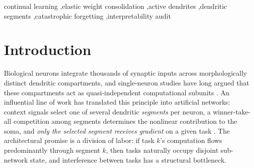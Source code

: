 \documentclass[review,12pt,number]{elsarticle}
\begin{document}
\begin{frontmatter}
\begin{abstract}
constant bias on the own-segment dendritic input raises the learning term
in every cell of a $\{$dataset$\}\times\{$depth$\}\times\{$granularity$\}$
grid ($\Delta\ell>0$ in $22/22$ dose cells, significant in $20/22$ at
$n{=}10$ paired), with final accuracy improving in step ($19/22$
simultaneously significant, and every grid cell significant on both terms
at some dose; $\Delta\ell$ up to $+4.6$, $t(9){=}8.1$); forgetting is
reduced at $T{=}10$ ($\Delta\mathrm{BWT}$ up to $+1.7$) and mildly traded
back at $T{=}20$ (significant in $3/10$ cells). Signed-drift
instrumentation shows the network never counteracts the bias at the
parameter level; the own-segment win rate saturates at $0.13$--$0.19$
regardless of dose because any effective dose dominates the raw gate
scale --- partial restoration suffices. A companion mechanism probe
(S4) then revises the reading: the repaired gate is
\emph{context-degenerate} (swapping the context one-hot changes
$0.0\%$ of predictions at $b{=}10$), and a gate-removal control
reproduces the gain on MNIST, so the bias pays by removing the gate's
dependence on context rather than by restoring segment--task routing.
Segment--task
specialization in this architecture family is thus not a weak tendency but an
actively violated assumption --- and one whose absence the repair
compensates for rather than cures.
\end{abstract}

\begin{keyword}
continual learning \sep elastic weight consolidation \sep active dendrites
\sep dendritic segments \sep catastrophic forgetting \sep interpretability
audit
\end{keyword}

\end{frontmatter}

\linenumbers

\section{Introduction}
\label{sec:intro}

Biological neurons integrate thousands of synaptic inputs across morphologically
distinct dendritic compartments, and single-neuron studies have long argued
that these compartments act as quasi-independent computational subunits
\cite{poirazi2003,london2005,poirazi2020}. An influential line of work has
translated this principle into artificial networks: context signals select
one of several dendritic \emph{segments} per neuron, a winner-take-all
competition among segments determines the nonlinear contribution to the
soma, and \emph{only the selected segment receives gradient} on a given task
\cite{iyer2022}. The architectural promise is a division of labor: if task
$k$'s computation flows predominantly through segment $k$, then tasks
naturally occupy disjoint sub-network state, and interference between tasks
has a structural bottleneck.
\end{document}
